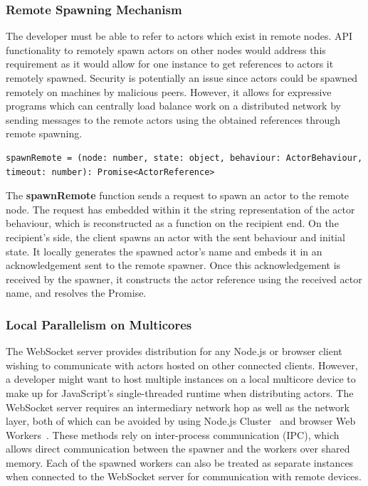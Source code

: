 \documentclass[lettersize,journal]{IEEEtran}
\begin{document}
\subsubsection{Remote Spawning Mechanism}
The developer must be able to refer to actors which exist in remote nodes. API functionality to remotely spawn actors on other nodes would address this requirement as it would allow for one instance to get references to actors it remotely spawned. Security is potentially an issue since actors could be spawned remotely on machines by malicious peers. However, it allows for expressive programs which can centrally load balance work on a distributed network by sending messages to the remote actors using the obtained references through remote spawning.
\begin{lstlisting}
spawnRemote = (node: number, state: object, behaviour: ActorBehaviour, timeout: number): Promise<ActorReference>
\end{lstlisting}

The \textbf{spawnRemote} function sends a request to spawn an actor to the remote node. The request has embedded within it the string representation of the actor behaviour, which is reconstructed as a function on the recipient end. On the recipient's side, the client spawns an actor with the sent behaviour and initial state. It locally generates the spawned actor's name and embeds it in an acknowledgement sent to the remote spawner. Once this acknowledgement is received by the spawner, it constructs the actor reference using the received actor name, and resolves the Promise.

\subsubsection{Local Parallelism on Multicores}
The WebSocket server provides distribution for any Node.js or browser client wishing to communicate with actors hosted on other connected clients. However, a developer might want to host multiple instances on a local multicore device to make up for JavaScript's single-threaded runtime when distributing actors. The WebSocket server requires an intermediary network hop as well as the network layer, both of which can be avoided by using Node.js Cluster~\cite{nodejs, cluster} and browser Web Workers~\cite{webworkers}. These methods rely on inter-process communication (IPC), which allows direct communication between the spawner and the workers over shared memory. Each of the spawned workers can also be treated as separate instances when connected to the WebSocket server for communication with remote devices.
\end{document}
